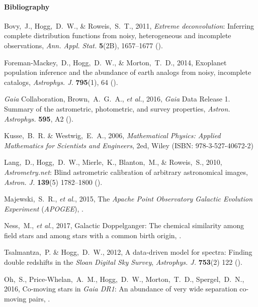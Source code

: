 \documentclass[12pt,letterpaper]{article}
\newcommand{\foreign}[1]{\textsl{#1}}
\newcommand{\project}[1]{\textsl{#1}}
\newcommand{\acronym}[1]{{\small{#1}}}
\newcommand{\etal}{\foreign{et al.}}
\begin{document}
\paragraph{Bibliography}
\begin{list}{}{\itemsep=0pt \parskip=0pt \parsep=0pt \leftmargin=\parindent \itemindent=-\parindent}
\item Bovy,~J., Hogg,~D.~W., \& Roweis,~S.~T., 2011,
  \project{Extreme deconvolution}: Inferring complete distribution functions from noisy, heterogeneous and incomplete observations,
  \textit{Ann. Appl. Stat.} \textbf{5}(2B), 1657--1677 ().
\item Foreman-Mackey,~D., Hogg,~D.~W., \& Morton,~T.~D., 2014,
  Exoplanet population inference and the abundance of earth analogs from noisy, incomplete catalogs,
  \textit{Astrophys. J.} \textbf{795}(1), 64 ().
\item \project{Gaia} Collaboration, Brown,~A.~G.~A., \etal, 2016,
  \project{Gaia} Data Release 1. Summary of the astrometric, photometric, and survey properties,
  \textit{Astron. Astrophys.} \textbf{595}, A2 ().
\item Kusse,~B.~R. \& Westwig,~E.~A., 2006,
  \textit{Mathematical Physics: Applied Mathematics for Scientists and Engineers},
  2ed, Wiley (\acronym{ISBN}: 978-3-527-40672-2)
\item Lang,~D., Hogg,~D.~W., Mierle,~K., Blanton,~M., \& Roweis,~S., 2010,
  \project{Astrometry.net}: Blind astrometric calibration of arbitrary astronomical images,
  \textit{Astron. J.} \textbf{139}(5) 1782--1800 ().
\item Majewski,~S.~R., \etal, 2015,
  The \project{Apache Point Observatory Galactic Evolution Experiment} (\project{\acronym{APOGEE}}),
  .
\item Ness,~M., \etal, 2017,
  Galactic Doppelganger: The chemical similarity among field stars and among stars with a common birth origin,
  .
\item Tsalmantza,~P. \& Hogg,~D.~W., 2012,
  A data-driven model for spectra: Finding double redshifts in the \project{Sloan Digital Sky Survey},
  \textit{Astrophys. J.} \textbf{753}(2) 122 ().
\item Oh,~S., Price-Whelan,~A.~M., Hogg,~D.~W., Morton,~T.~D., Spergel,~D.~N., 2016,
  Co-moving stars in \project{Gaia DR1}: An abundance of very wide separation co-moving pairs,
  .
\end{list}
\end{document}
